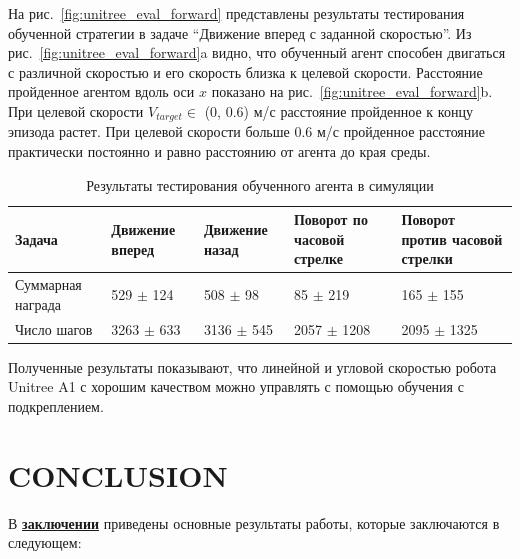 На рис.~\ref{fig:unitree_eval_forward} представлены результаты тестирования обученной стратегии в задаче ``Движение вперед с заданной скоростью''. Из рис.~\ref{fig:unitree_eval_forward}a видно, что обученный агент способен двигаться с различной скоростью и его скорость близка к целевой скорости. Расстояние пройденное агентом вдоль оси $x$ показано на рис.~\ref{fig:unitree_eval_forward}b. При целевой скорости $V_{target} \in$ (0, 0.6) м/с расстояние пройденное к концу эпизода растет. При целевой скорости больше 0.6 м/с пройденное расстояние практически постоянно и равно расстоянию от агента до края среды.

\begin{table} [htbp]
    \centering
    \begin{threeparttable}
        \caption{Результаты тестирования обученного агента в симуляции}\label{tab:unitree_eval}
        \begin{tabular}{| p{2cm} || p{2cm} | p{2cm} | p{2cm} |p{2cm} |}
            \hline
            \hline
            Задача & Движение вперед & Движение назад & Поворот по часовой стрелке & Поворот против часовой стрелки \\
            \hline
            Суммарная награда &	529 $\pm$ 124 &	508 $\pm$ 98 &	85 $\pm$ 219 &	165 $\pm$ 155 \\
            Число шагов & 3263 $\pm$ 633 &	3136 $\pm$ 545 &	2057 $\pm$ 1208 &	2095 $\pm$ 1325 \\
            \hline
            \hline
        \end{tabular}
    \end{threeparttable}
\end{table}

Полученные результаты показывают, что линейной и угловой скоростью робота Unitree A1 с хорошим качеством можно управлять с помощью обучения с подкреплением. 



\FloatBarrier
\section*{\centering CONCLUSION}
В \underline{\textbf{заключении}} приведены основные результаты работы, которые заключаются в следующем:



